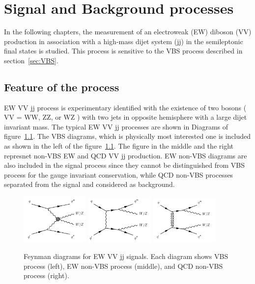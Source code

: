 \chapter{Signal and Background processes}
\label{chap:sigbkg}
In the following chapters, the measurement of an electroweak (EW) diboson (VV) production in association with a high-mass dijet system (jj) in the semileptonic final states is studied.
This process is sensitive to the VBS process described in section~\ref{sec:VBS}.
\section{Feature of the process}
EW VV jj process is experimentary identified with the existence of two bosons ( VV = WW, ZZ, or WZ ) with two jets in opposite hemisphere with a large dijet invariant mass.
The typical EW VV jj processes are shown in Diagrams of figure~\ref{fig:feynmanEWVVjj}.
The VBS diagrams, which is physically most interested one is included as shown in the left of the figure~\ref{fig:feynmanEWVVjj}. The figure in the middle and the right represnet non-VBS EW and QCD VV jj production. EW non-VBS diagrams are also included in the signal process since they cannot be distinguished from VBS process for the gauge invariant conservation, while QCD non-VBS processes separated from the signal and considered as background.

\begin{figure}[H]
\begin{center}
 \includegraphics[width=0.3\textwidth,keepaspectratio]{figures/EWVVjj_a.png}
 \includegraphics[width=0.3\textwidth,keepaspectratio]{figures/EWVVjj_b.png}
 \includegraphics[width=0.3\textwidth,keepaspectratio]{figures/EWVVjj_c.png}

\caption[f]{
Feynman diagrams for EW VV jj signals. Each diagram shows VBS process (left), EW non-VBS process (middle), and QCD non-VBS process (right).
}
\label{fig:feynmanEWVVjj}
\end{center}
\end{figure}


